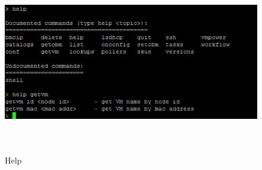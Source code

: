 \documentclass [12pt, a4paper, titlepage]{article}
\begin{document}
        \begin{figure}[H]
        \begin{center}
        \includegraphics[width=13cm,height=8cm]{png/help}
        \end{center}
        \caption{Help}
        \label{help}
        \end{figure}
\end{document}
